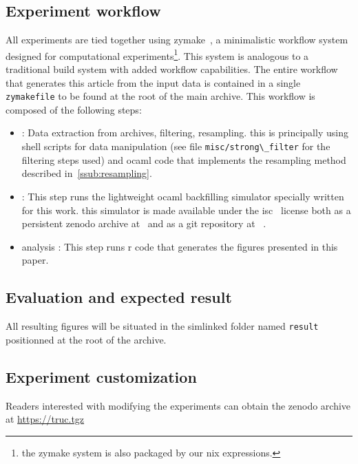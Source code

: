 \documentclass[sigconf,review,anonymous]{acmart}
\begin{document}
\subsection{Experiment workflow}

 All experiments are tied together using zymake~\cite{zymake}, a minimalistic
 workflow system designed for computational experiments\footnote{the zymake system
 is also packaged by our nix expressions.}. This system is
 analogous to a traditional build system with added workflow capabilities. The
 entire workflow that generates this article from the input data is contained
 in a single \lstinline[basicstyle=\ttfamily\color{blue}]|zymakefile| to be
 found at the root of the main archive. This workflow is composed of the
 following steps:

 \begin{itemize}
   \item[data]: Data extraction from archives, filtering, resampling.
     this is principally using shell scripts for data manipulation (see file
     \lstinline[basicstyle=\ttfamily\color{blue}]|misc/strong\_filter| for the
     filtering steps used) and ocaml code that implements the resampling method
     described in~\ref{ssub:resampling}.

   \item[simulation]: This step runs the lightweight ocaml backfilling
     simulator specially written for this work. this simulator is made
     available under the isc~\cite{isc} license both as a persistent zenodo
     archive at~\cite{ocst} and as a git repository at ~\cite{ocstgit}.

   \item[analysis]: This step runs r code that generates the figures
     presented in this paper.
 \end{itemize}


\subsection{Evaluation and expected result}

All resulting figures will be situated in the simlinked folder named
\lstinline[basicstyle=\ttfamily\color{blue}]|result| positionned at the root of
the archive.

\subsection{Experiment customization}

Readers interested with modifying the experiments can obtain the zenodo archive
at \url{https://truc.tgz}
\end{document}
